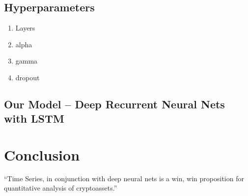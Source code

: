 \documentclass{article}
\begin{document}
\subsection{Hyperparameters}
\begin{enumerate}
    \item Layers
    \item alpha
    \item gamma
    \item dropout
\end{enumerate}

\subsection{Our Model – Deep Recurrent Neural Nets with LSTM}

\section{Conclusion}
``Time Series, in conjunction with deep neural nets is a win, win proposition for quantitative analysis of cryptoassets.'' \citep{adams1995hitchhiker}



\end{document}
